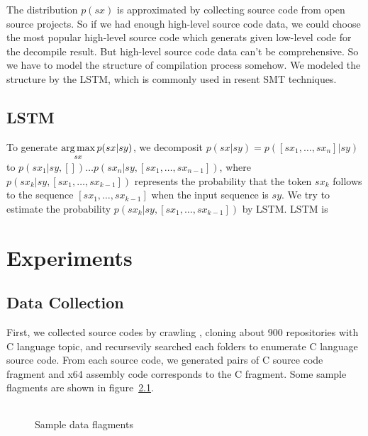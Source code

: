 \documentclass[senior,final,11pt]{iscs-thesis}
\newcommand{\argmax}{\mathop{\rm arg\,max}\limits}
\begin{document}
The distribution $p(sx)$ is approximated by collecting source code from open source projects.
So if we had enough high-level source code data, we could choose the most popular high-level source code which generats given low-level code for the decompile result.
But high-level source code data can't be comprehensive.
So we have to model the structure of compilation process somehow.
We modeled the structure by the LSTM, which is commonly used in resent SMT techniques.

\section{LSTM}
To generate $ \argmax_{sx} p(sx|sy)$, we decomposit $ p(sx|sy) = p([sx_1, \dots, sx_n] |sy) $ to $ p(sx_1|sy,[]) \dots p(sx_n|sy,[sx_1,\dots,sx_{n-1}]) $,
where $ p(sx_k|sy,[sx_1,\dots,sx_{k-1}]) $ represents the probability that the token $ sx_k $ follows to the sequence $ [sx_1,\dots,sx_{k-1}] $ 
when the input sequence is $ sy $. We try to estimate the probability $ p(sx_k|sy,[sx_1,\dots,sx_{k-1}]) $ by LSTM.
LSTM is 


\chapter{Experiments}

\section{Data Collection}
First, we collected source codes by crawling \cite[GitHub]{github}, cloning about 900 repositories with C language topic, 
and recursevily searched each folders to enumerate C language source code.
From each source code, we generated pairs of C source code fragment and x64 assembly code corresponds to the C fragment.
Some sample flagments are shown in figure~\ref{fig:pairsofflagments}. 


\begin{figure}
	\begin{tabular}{cc}
	\end{tabular}
	\caption{Sample data flagments}
	\label{fig:pairsofflagments}
\end{figure}
\end{document}
